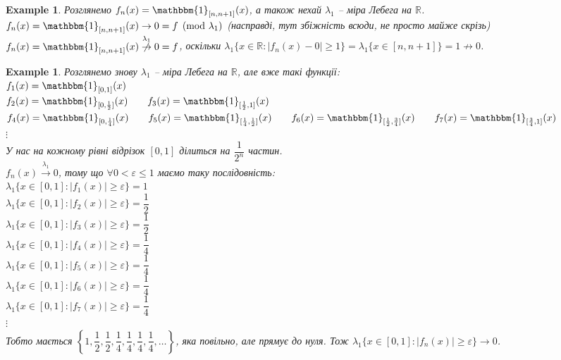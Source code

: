 \documentclass[a4paper, 10pt]{article}
\theoremstyle{theoremdd}
\newtheorem{example}[theorem]{Example}
\newcommand\tomeasure[1]{\overset{{#1}}{\to}}
\newcommand\nottomeasure[1]{\overset{{#1}}{\centernot\to}}
\begin{document}
\begin{example}
Розглянемо $f_n(x) = \mathbbm{1}_{[n,n+1]}(x)$, а також нехай $\lambda_1$ -- міра Лебега на $\mathbb{R}$.\\
$f_n(x) = \mathbbm{1}_{[n,n+1]}(x) \to 0 = f \pmod {\lambda_1}$ (насправді, тут збіжність всюди, не просто майже скрізь)\\
$f_n(x) = \mathbbm{1}_{[n,n+1]}(x) \nottomeasure{\lambda_1} 0 = f$, оскільки $\lambda_1\{x \in \mathbb{R}: |f_n(x)-0| \geq 1 \} = \lambda_1 \{x \in [n,n+1] \} = 1 \not\to 0$.
\end{example}

\begin{example}
Розглянемо знову $\lambda_1$ -- міра Лебега на $\mathbb{R}$, але вже такі функції:\\
$f_1(x) = \mathbbm{1}_{[0,1]}(x)$\\
$f_2(x) = \mathbbm{1}_{[0,\frac{1}{2}]}(x) \qquad f_3(x) = \mathbbm{1}_{[\frac{1}{2},1]}(x)$\\
$f_4(x) = \mathbbm{1}_{[0,\frac{1}{4}]}(x) \qquad f_5(x) = \mathbbm{1}_{[\frac{1}{4},\frac{1}{2}]}(x) \qquad f_6(x) = \mathbbm{1}_{[\frac{1}{2}, \frac{3}{4}]}(x) \qquad f_7(x) = \mathbbm{1}_{[\frac{3}{4},1]}(x)$\\
$\vdots$\\
У нас на кожному рівні відрізок $[0,1]$ ділиться на $\dfrac{1}{2^n}$ частин.\\
$f_n(x) \tomeasure{\lambda_1} 0$, тому що $\forall 0 < \varepsilon \leq 1$ маємо таку послідовність:\\
$\lambda_1\{x \in [0,1]: |f_1(x)| \geq \varepsilon\} = 1$\\
$\lambda_1\{x \in [0,1]: |f_2(x)| \geq \varepsilon\} = \dfrac{1}{2}$\\
$\lambda_1\{x \in [0,1]: |f_3(x)| \geq \varepsilon\} = \dfrac{1}{2}$\\
$\lambda_1\{x \in [0,1]: |f_4(x)| \geq \varepsilon\} = \dfrac{1}{4}$\\
$\lambda_1\{x \in [0,1]: |f_5(x)| \geq \varepsilon\} = \dfrac{1}{4}$\\
$\lambda_1\{x \in [0,1]: |f_6(x)| \geq \varepsilon\} = \dfrac{1}{4}$\\
$\lambda_1\{x \in [0,1]: |f_7(x)| \geq \varepsilon\} = \dfrac{1}{4}$\\
$\vdots$\\
Тобто мається $\left\{ 1,\dfrac{1}{2},\dfrac{1}{2},\dfrac{1}{4},\dfrac{1}{4},\dfrac{1}{4},\dfrac{1}{4}, \dots \right\}$, яка повільно, але прямує до нуля. Тож $\lambda_1 \{x \in [0,1]: |f_n(x)| \geq \varepsilon\} \to 0$.\\

\end{example}
\end{document}
